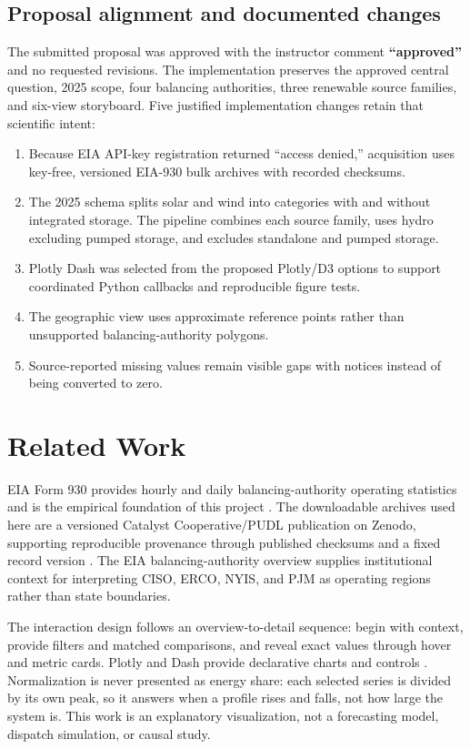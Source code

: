 \documentclass[11pt]{article}
\begin{document}
\subsection{Proposal alignment and documented changes}
The submitted proposal was approved with the instructor comment \textbf{``approved''} and no requested revisions. The implementation preserves the approved central question, 2025 scope, four balancing authorities, three renewable source families, and six-view storyboard. Five justified implementation changes retain that scientific intent:
\begin{enumerate}
  \item Because EIA API-key registration returned ``access denied,'' acquisition uses key-free, versioned EIA-930 bulk archives with recorded checksums.
  \item The 2025 schema splits solar and wind into categories with and without integrated storage. The pipeline combines each source family, uses hydro excluding pumped storage, and excludes standalone and pumped storage.
  \item Plotly Dash was selected from the proposed Plotly/D3 options to support coordinated Python callbacks and reproducible figure tests.
  \item The geographic view uses approximate reference points rather than unsupported balancing-authority polygons.
  \item Source-reported missing values remain visible gaps with notices instead of being converted to zero.
\end{enumerate}

\section{Related Work}
EIA Form 930 provides hourly and daily balancing-authority operating statistics and is the empirical foundation of this project \citep{eia930,eia-gridmonitor}. The downloadable archives used here are a versioned Catalyst Cooperative/PUDL publication on Zenodo, supporting reproducible provenance through published checksums and a fixed record version \citep{pudl-zenodo}. The EIA balancing-authority overview supplies institutional context for interpreting CISO, ERCO, NYIS, and PJM as operating regions rather than state boundaries.

The interaction design follows an overview-to-detail sequence: begin with context, provide filters and matched comparisons, and reveal exact values through hover and metric cards. Plotly and Dash provide declarative charts and controls \citep{plotly,dash}. Normalization is never presented as energy share: each selected series is divided by its own peak, so it answers when a profile rises and falls, not how large the system is. This work is an explanatory visualization, not a forecasting model, dispatch simulation, or causal study.
\end{document}
